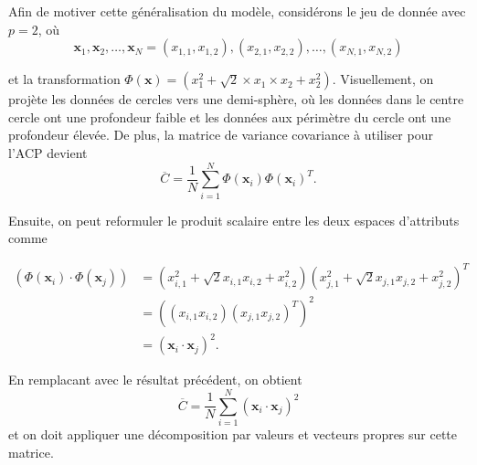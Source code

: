 Afin de motiver cette généralisation du modèle, considérons le jeu de donnée avec $p = 2$, où
$$\textbf{x}_1, \textbf{x}_2, \dots, \textbf{x}_N = (x_{1,1},x_{1,2}), (x_{2,1}, x_{2,2}), …, (x_{N,1}, x_{N,2})$$

et la transformation $\Phi(\textbf{x})= (x_1^2 + \sqrt{2} \times x_1\times x_2 + x_2^2)$. Visuellement, on projète les données de cercles vers une demi-sphère, où les données dans le centre cercle ont une profondeur faible et les données aux périmètre du cercle ont une profondeur élevée. De plus, la matrice de variance covariance à utiliser pour l’ACP devient
$$\overline{C} = \frac{1}{N} \sum_{i = 1}^{N}   \Phi(\textbf{x}_i) \Phi(\textbf{x}_i)^{T}.$$

Ensuite, on peut reformuler le produit scalaire entre les deux espaces d'attributs comme

\begin{align*}
(\Phi(\textbf{x}_i) \cdot \Phi(\textbf{x}_j)) &= (x_{i, 1}^2 + \sqrt{2} x_{i, 1} x_{i, 2} + x_{i, 2}^2)(x_{j, 1}^2 + \sqrt{2} x_{j, 1} x_{j, 2} + x_{j, 2}^2)^T\\
&= ((x_{i, 1}x_{i, 2})(x_{j, 1}x_{j, 2})^T)^2\\
&= (\textbf{x}_i \cdot \textbf{x}_j)^2.
\end{align*}

En remplacant avec le résultat précédent, on obtient
$$\overline{C} = \frac{1}{N} \sum_{i = 1}^{N} (\textbf{x}_i \cdot \textbf{x}_j)^2$$ et on doit appliquer une décomposition par valeurs et vecteurs propres sur cette matrice.